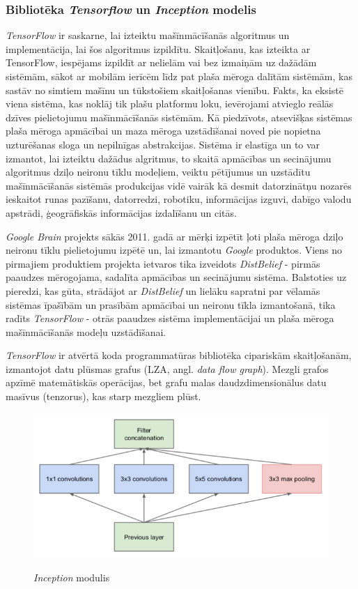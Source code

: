 \documentclass[12pt,paper=a4]{report}
\begin{document}
\subsubsection{Bibliotēka \textit{Tensorflow} un \textit{Inception} modelis} \textit{TensorFlow} ir saskarne, lai izteiktu mašīnmācīšanās algoritmus un implementācija, lai šos algoritmus izpildītu. Skaitļošanu, kas izteikta ar TensorFlow, iespējams izpildīt ar nelielām vai bez izmaiņām uz dažādām sistēmām, sākot ar mobilām ierīcēm līdz pat plaša mēroga dalītām sistēmām, kas sastāv no simtiem mašīnu un tūkstošiem skaitļošanas vienību. Fakts, ka eksistē viena sistēma, kas noklāj tik plašu platformu loku, ievērojami atvieglo reālās dzīves pielietojumu mašīnmācīšanās sistēmām. Kā piedzīvots, atsevišķas sistēmas plaša mēroga apmācībai un maza mēroga uzstādīšanai noved pie nopietna uzturēšanas sloga un nepilnīgas abstrakcijas. Sistēma ir elastīga un to var izmantot, lai izteiktu dažādus algritmus, to skaitā apmācības un secinājumu algoritmus dziļo neironu tīklu modeļiem, veiktu pētījumus un uzstādītu mašīnmācīšanās sistēmās produkcijas vidē vairāk kā desmit datorzinātņu nozarēs ieskaitot runas pazīšanu, datorredzi, robotiku, informācijas izguvi, dabīgo valodu apstrādi, ģeogrāfiskās informācijas izdalīšanu un citās. \cite{tensorflow}\par
\textit{Google Brain} projekts sākās 2011. gadā ar mērķi izpētīt ļoti plaša mēroga dziļo neironu tīklu pielietojumu izpētē un, lai izmantotu \textit{Google} produktos. Viens no pirmajiem produktiem projekta ietvaros tika izveidots \textit{DistBelief} - pirmās paaudzes mērogojama, sadalīta apmācības un secinājumu sistēma. Balstoties uz pieredzi, kas gūta, strādājot ar \textit{DistBelief} un lielāku sapratni par vēlamās sistēmas īpašībām un prasībām apmācībai un neironu tīkla izmantošanā, tika radīts \textit{TensorFlow} - otrās paaudzes sistēma implementācijai un plaša mēroga mašīnmācīšanās modeļu uzstādīšanai. \cite{tensorflow}\par
\textit{TensorFlow} ir atvērtā koda programmatūras bibliotēka cipariskām skaitļošanām, izmantojot datu plūsmas grafus (LZA, angl. \textit{data flow graph}). Mezgli grafos apzīmē matemātiskās operācijas, bet grafu malas daudzdimensionālus datu masīvus (tenzorus), kas starp mezgliem plūst. \cite{tensorflow}\par
\begin{figure}[h!]
\centering
\includegraphics[width=.7\linewidth]{inception1}
\label{fig:inception1}
\caption{\textit{Inception} modulis \cite{inception}}
\end{figure}
\end{document}
